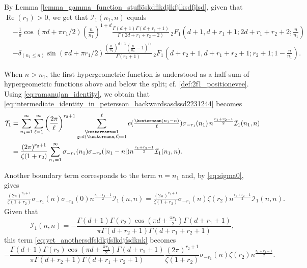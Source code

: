 \documentclass[]{article}
\renewcommand{\Re}{\operatorname{Re}}
\newcommand{\sumk}{\sum_{\substack{\kestermann = 1 \\ \gcd(\kestermann,\ell) = 1}}^\ell}
\begin{document}
By Lemma \ref{lemma_gamma_function_stuflöskdflkdjlkfjlksdfjlsd}, given that $\Re(r_1) > 0$,
we get that $\mathcal{I}_1(n_1,n)$ equals 
\begin{equation}\label{eq:upsilon}
    \begin{split}
  & - \frac{1}{\pi} \cos(\pi d + \pi r_1 / 2) (\frac{n}{n_1})^{1+d} \frac{\Gamma (d+1) \Gamma (d+r_1+1)}{  \Gamma(2 d+r_1+r_2+2) }  \, _2 F_1\left(d+1,d+r_1+1;2 d+r_1+r_2+2;\frac{n}{n_1}\right) \\
& - \delta_{(n_1 \le n)}   \sin(\pi d + \pi r_1 / 2) \frac{(\tfrac{n}{n_1})^{d+1} (\tfrac{n}{n_1}-1)^{r_2} }{\Gamma (r_2+1)} \, _2F_1 \left(d+r_2+1,d+r_1+r_2+1;r_2+1;1-\frac{n}{n_1} \right).
    \end{split}
\end{equation}

When $n>n_1$, the first hypergeometric function is understood as a half-sum of hypergeometric functions above and below the split; cf. \eqref{def:2f1_positionevee}. Using \eqref{eq:ramanujan_identity}, we obtain  that \eqref{eq:intermediate_identity_in_petersson_backwardsasdssd2231244} becomes 
\begin{equation}\label{eq:sum_with_negative_divisors}
    \begin{split}
  \mathcal{T}_1 & = \sum_{n_1=1}^\infty  		  \sum_{\ell=1}^\infty     \left( \frac{2 \pi }{\ell} \right)^{r_2+1}   \sumk e(\tfrac{ \kestermann (n_1 - n) }{\ell}) \sigma_{-r_1}(n_1) \,  n^{  \frac{ r_1+r_2-1 }{2}   } \mathcal{I}_1(n_1,n) \\ 
& = \frac{(2 \pi)^{r_2+1}}{ \zeta(1+r_2) }   \sum_{n_1=1}^\infty  		   \sigma_{-r_1}(n_1) \sigma_{-r_2}(|n_1-n|)  n^{  \frac{ r_1+r_2-1 }{2}   } \mathcal{I}_1(n_1,n).      \\
    \end{split}
\end{equation}

Another boundary term corresponds to the term $n=n_1$ and, by  \eqref{eq:sigma0}, gives
\begin{equation}\label{eq:yet_anothersdfsldkjfslkdjfsdknk}
\begin{split}
 \frac{(2 \pi)^{r_2+1}}{ \zeta(1+r_2) }     		   \sigma_{-r_1}(n) \sigma_{-r_2}(0)  n^{  \frac{ r_1+r_2-1 }{2}   } \mathcal{I}_1(n,n) 
=   \frac{(2 \pi)^{r_2+1}}{ \zeta(1+r_2) }     		   \sigma_{-r_1}(n) \zeta(r_2)  n^{  \frac{ r_1+r_2-1 }{2}   } \mathcal{I}_1(n,n).
\end{split}
\end{equation}
Given that 
\begin{equation}
    \mathcal{I}_1(n,n) = -\frac{\Gamma (d+1) \Gamma (r_2) \cos \left(\pi  d+\frac{\pi  r_1}{2}\right) \Gamma (d+r_1+1)}{\pi  \Gamma (d+r_2+1) \Gamma (d+r_1+r_2+1)},
\end{equation}
this term \eqref{eq:yet_anothersdfsldkjfslkdjfsdknk} becomes 
\begin{equation}
    -\frac{\Gamma (d+1) \Gamma (r_2) \cos \left(\pi  d+\frac{\pi  r_1}{2}\right) \Gamma (d+r_1+1)}{\pi  \Gamma (d+r_2+1) \Gamma (d+r_1+r_2+1)} \frac{(2 \pi)^{r_2+1}}{ \zeta(1+r_2) }     		   \sigma_{-r_1}(n) \zeta(r_2)  n^{  \frac{ r_1+r_2-1 }{2}   }.
\end{equation}
\end{document}
